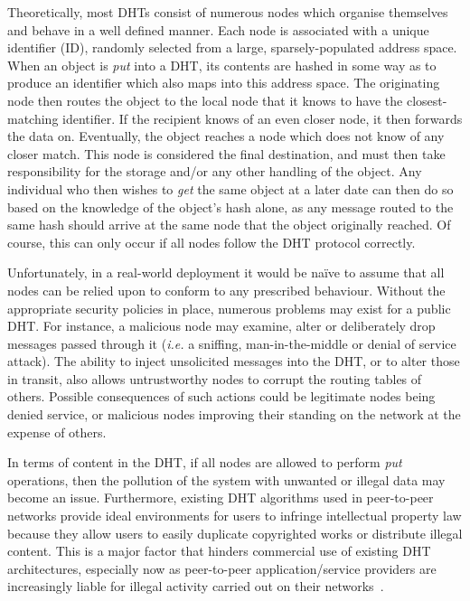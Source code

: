 \documentclass[pdftex,conference,10pt]{IEEEtran}
\begin{document}
Theoretically, most DHTs consist of numerous nodes which organise
themselves and behave in a well defined manner. Each node is
associated with a unique identifier (ID), randomly selected from a
large, sparsely-populated address space. When an object is
\emph{put} into a DHT, its contents are hashed in some way as to
produce an identifier which also maps into this address space. The
originating node then routes the object to the local node that it
knows to have the closest-matching identifier. If the recipient
knows of an even closer node, it then forwards the data on.
Eventually, the object reaches a node which does not know of any
closer match. This node is considered the final destination, and
must then take responsibility for the storage and/or any other
handling of the object. Any individual who then wishes to \emph{get}
the same object at a later date can then do so based on the
knowledge of the object's hash alone, as any message routed to the
same hash should arrive at the same node that the object originally
reached. Of course, this can only occur if all nodes follow the DHT
protocol correctly.

Unfortunately, in a real-world deployment it would be na\"ive to assume
that all nodes can be relied upon to conform to any prescribed
behaviour. Without the appropriate security policies in place, numerous
problems may exist for a public DHT. For instance, a malicious node may
examine, alter or deliberately drop messages passed through it
(\emph{i.e.} a sniffing, man-in-the-middle or denial of service
attack). The ability to inject unsolicited messages into the DHT, or to
alter those in transit, also allows untrustworthy nodes to corrupt the
routing tables of others. Possible consequences of such actions could be
legitimate nodes being denied service, or malicious nodes improving
their standing on the network at the expense of others.

In terms of content in the DHT, if all nodes are allowed to perform
\emph{put} operations, then the pollution of the system with unwanted
or illegal data may become an issue. Furthermore, existing DHT
algorithms used in peer-to-peer networks provide ideal environments for
users to infringe intellectual property law because they allow users to
easily duplicate copyrighted works or distribute illegal content. This
is a major factor that hinders commercial use of existing DHT
architectures, especially now as peer-to-peer application/service
providers are increasingly liable for illegal activity carried out on
their networks~\cite{court}.
\end{document}
